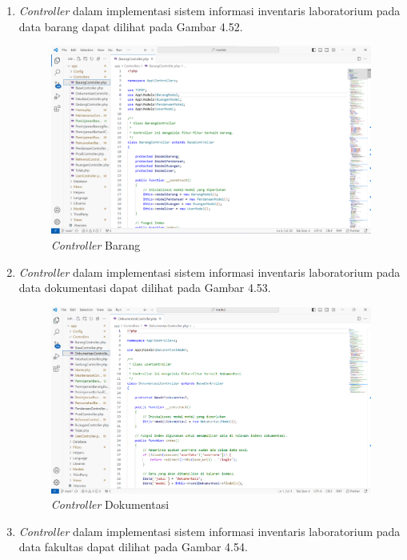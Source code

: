\begin{enumerate}
  \item \textit{Controller} dalam implementasi sistem informasi inventaris laboratorium pada data barang dapat dilihat pada Gambar 4.52.

        \begin{figure}
          \centering
          \includegraphics[width=0.82\linewidth]{konten//gambar/barang controller.png}
          \caption{\textit{Controller} Barang}
          \label{fig:enter-label}
        \end{figure}

  \item \textit{Controller} dalam implementasi sistem informasi inventaris laboratorium pada data dokumentasi dapat dilihat pada Gambar 4.53.

        \begin{figure}
          \centering
          \includegraphics[width=0.82\linewidth]{konten//gambar/dokumentasi controller.png}
          \caption{\textit{Controller} Dokumentasi}
          \label{fig:enter-label}
        \end{figure}

  \item \textit{Controller} dalam implementasi sistem informasi inventaris laboratorium pada data fakultas dapat dilihat pada Gambar 4.54.


\end{enumerate}
